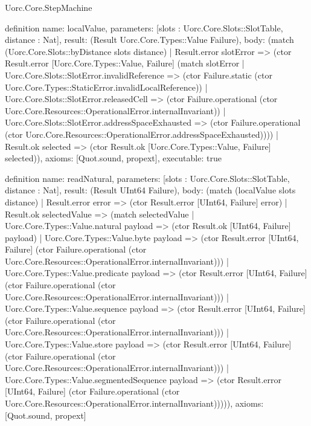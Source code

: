 \begin{lexlean}{Uorc.Core.StepMachine}
\begin{semanticmodule}
definition{
  name: localValue,
  parameters: [slots : Uorc.Core.Slots::SlotTable, distance : Nat],
  result: (Result Uorc.Core.Types::Value Failure),
  body: (match (Uorc.Core.Slots::byDistance slots distance)
    | Result.error slotError => (ctor Result.error [Uorc.Core.Types::Value, Failure] (match slotError
      | Uorc.Core.Slots::SlotError.invalidReference => (ctor Failure.static (ctor Uorc.Core.Types::StaticError.invalidLocalReference))
      | Uorc.Core.Slots::SlotError.releasedCell => (ctor Failure.operational (ctor Uorc.Core.Resources::OperationalError.internalInvariant))
      | Uorc.Core.Slots::SlotError.addressSpaceExhausted => (ctor Failure.operational (ctor Uorc.Core.Resources::OperationalError.addressSpaceExhausted))))
    | Result.ok selected => (ctor Result.ok [Uorc.Core.Types::Value, Failure] selected)),
  axioms: [Quot.sound, propext],
  executable: true
}

definition{
  name: readNatural,
  parameters: [slots : Uorc.Core.Slots::SlotTable, distance : Nat],
  result: (Result UInt64 Failure),
  body: (match (localValue slots distance)
    | Result.error error => (ctor Result.error [UInt64, Failure] error)
    | Result.ok selectedValue => (match selectedValue
      | Uorc.Core.Types::Value.natural payload => (ctor Result.ok [UInt64, Failure] payload)
      | Uorc.Core.Types::Value.byte payload => (ctor Result.error [UInt64, Failure] (ctor Failure.operational (ctor Uorc.Core.Resources::OperationalError.internalInvariant)))
      | Uorc.Core.Types::Value.predicate payload => (ctor Result.error [UInt64, Failure] (ctor Failure.operational (ctor Uorc.Core.Resources::OperationalError.internalInvariant)))
      | Uorc.Core.Types::Value.sequence payload => (ctor Result.error [UInt64, Failure] (ctor Failure.operational (ctor Uorc.Core.Resources::OperationalError.internalInvariant)))
      | Uorc.Core.Types::Value.store payload => (ctor Result.error [UInt64, Failure] (ctor Failure.operational (ctor Uorc.Core.Resources::OperationalError.internalInvariant)))
      | Uorc.Core.Types::Value.segmentedSequence payload => (ctor Result.error [UInt64, Failure] (ctor Failure.operational (ctor Uorc.Core.Resources::OperationalError.internalInvariant))))),
  axioms: [Quot.sound, propext]
}


\end{semanticmodule}
\end{lexlean}
